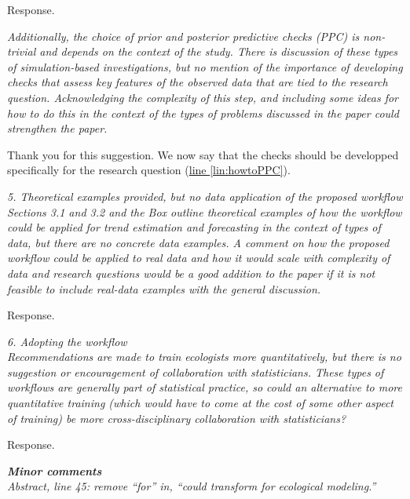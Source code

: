 \documentclass[11pt,letter]{article}
\begin{document}
Response.

\begin{mybox}
\emph{Additionally, the choice of prior and posterior predictive checks (PPC) is non-trivial and depends on the context of the study. There is discussion of these types of simulation-based investigations, but no mention of the importance of developing checks that assess key features of the observed data that are tied to the research question. Acknowledging the complexity of this step, and including some ideas for how to do this in the context of the types of problems discussed in the paper could strengthen the paper.}
\end{mybox}

Thank you for this suggestion. We now say that the checks should be developped specifically for the research question (\href{file:forecastflows_r1\#lintarget:howtoPPC}{line \ref*{lin:howtoPPC}}). 

\begin{mybox}
\emph{5. Theoretical examples provided, but no data application of the proposed workflow\\
Sections 3.1 and 3.2 and the Box outline theoretical examples of how the workflow could be applied for trend estimation and forecasting in the context of types of data, but there are no concrete data examples. A comment on how the proposed workflow could be applied to real data and how it would scale with complexity of data and research questions would be a good addition to the paper if it is not feasible to include real-data examples with the general discussion.}
\end{mybox}

Response.

\begin{mybox}
\emph{6. Adopting the workflow\\
Recommendations are made to train ecologists more quantitatively, but there is no suggestion or encouragement of collaboration with statisticians. These types of workflows are generally part of statistical practice, so could an alternative to more quantitative training (which would have to come at the cost of some other aspect of training) be more cross-disciplinary collaboration with statisticians?}
\end{mybox}

Response.

\begin{mybox}
\emph{\textbf{Minor comments}\\
Abstract, line 45: remove “for” in, “could transform for ecological modeling.”}
\end{mybox}
\end{document}

